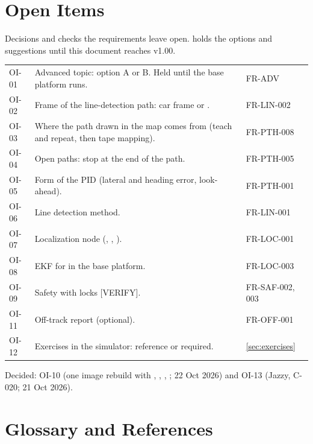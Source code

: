 \documentclass[11pt,a4paper]{article}
\begin{document}
\section{Open Items}
Decisions and checks the requirements leave open.  holds the options and suggestions until this document reaches v1.00.

\begin{tabularx}{\textwidth}{@{}L{1.4cm} Y L{2.6cm}@{}}
\toprule
{} &  &  \\
\midrule
\endhead
OI-01 & Advanced topic: option A or B. Held until the base platform runs. & FR-ADV \\
OI-02 & Frame of the line-detection path: car frame or . & FR-LIN-002 \\
OI-03 & Where the path drawn in the map comes from (teach and repeat, then tape mapping). & FR-PTH-008 \\
OI-04 & Open paths: stop at the end of the path. & FR-PTH-005 \\
OI-05 & Form of the PID (lateral and heading error, look-ahead). & FR-PTH-001 \\
OI-06 & Line detection method. & FR-LIN-001 \\
OI-07 & Localization node (, , ). & FR-LOC-001 \\
OI-08 & EKF for  in the base platform. & FR-LOC-003 \\
OI-09 & Safety with  locks [VERIFY]. & FR-SAF-002, 003 \\
OI-11 & Off-track report (optional). & FR-OFF-001 \\
OI-12 & Exercises in the simulator: reference or required. & \cref{sec:exercises} \\
\bottomrule
\end{tabularx}

Decided: OI-10 (one image rebuild with , , , ; 22 Oct 2026) and OI-13 (Jazzy, C-020; 21 Oct 2026).

\section{Glossary and References}
\end{document}
